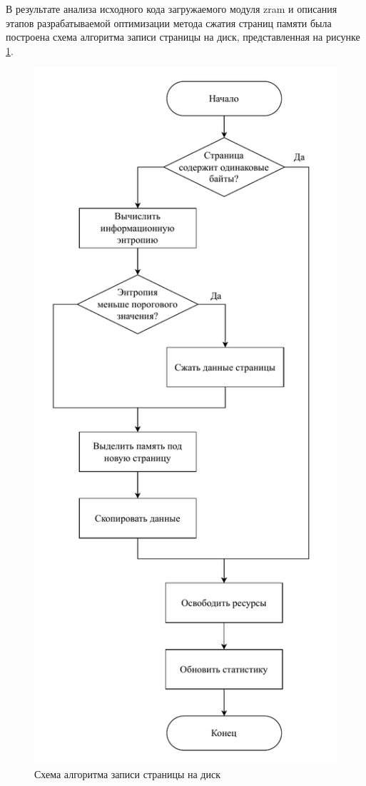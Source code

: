 В результате анализа исходного кода загружаемого модуля zram \cite{zram-code} и описания этапов разрабатываемой оптимизации метода сжатия страниц памяти была построена схема алгоритма записи страницы на диск, представленная на рисунке \ref{img:write-page}.

\begin{figure}[H]
	\begin{center}
		\includegraphics[scale=0.7]{inc/img/write-page.pdf}
	\end{center}
	\captionsetup{justification=centering}
	\caption{Схема алгоритма записи страницы на диск}
	\label{img:write-page}
\end{figure}

